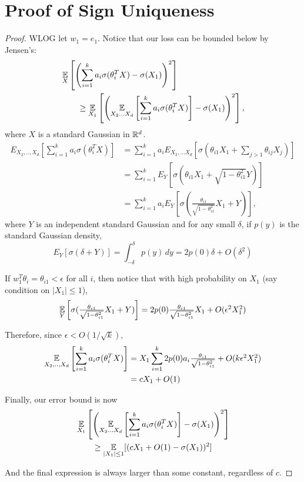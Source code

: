 
\section{Proof of Sign Uniqueness}



\begin{proof}
WLOG let $w_1 = e_1$. Notice that our loss can be bounded below by Jensen's:
%
\begin{align*}
& \operatorname*{\mathbb{E}}_X \left[ \left( \sum_{i=1}^k a_i \sigma(\theta_i^TX) - \sigma(X_1)\right)^2 \right] \\
& \qquad 
\geq \operatorname*{\mathbb{E}}_{X_1} \left[ \left( {\operatorname*{\mathbb{E}}_{X_2...X_d}{\left[ \sum_{i=1}^k a_i \sigma(\theta_i^TX) \right]}}- \sigma(X_1)\right)^2 \right],
\end{align*}
where $X$ is a standard Gaussian in ${\mathbb{R}}^d$. 
%
\begin{align*}
E_{X_2,..,X_d} \left[  \sum_{i=1}^k a_i \sigma(\theta_i^TX) \right] &= \sum_{i=1}^k a_i E_{X_2,...X_d}\left[  \sigma(\theta_{i1}X_1 + \sum_{j >1} \theta_{ij}X_{j})  \right]\\
&= \sum_{i=1}^k E_{Y} \left[   \sigma(\theta_{i1}X_1 + \sqrt{1-\theta_{i1}^2}Y)  \right]  \\
&= \sum_{i=1}^k a_i E_{Y} \left[   \sigma(\textstyle\frac{\theta_{i1}}{\sqrt{1-\theta_{i1}^2}}X_1 + Y)  \right] ,
\end{align*}
where $Y$ is an independent standard Gaussian and for any small $\delta$, if $p(y)$ is the standard Gaussian density, 
%
\[ E_Y[\sigma(\delta + Y)] = \int_{-\delta}^{\delta} p(y) \, dy = 2p(0)\delta + O(\delta^2) \]

If $w_1^T\theta_i = \theta_{i1} < \epsilon$ for all $i$, then notice that with high probability on $X_1$ (say condition on $|X_1| \leq 1$), 
%
\[\operatorname*{\mathbb{E}}_{Y} \left[   \sigma(\textstyle\frac{\theta_{i1}}{\sqrt{1-\theta_{i1}^2}}X_1 + Y)  \right] = 2p(0)\textstyle\frac{\theta_{i1}}{\sqrt{1-\theta_{i1}^2}}X_1 + O(\epsilon^2X_1^2)\]

Therefore, since $\epsilon < O(1/\sqrt{k})$,
%
\begin{align*}
\operatorname*{\mathbb{E}}_{X_2,..,X_d} \left[  \sum_{i=1}^k a_i \sigma(\theta_i^TX)
  \right]  & = X_1
  \sum_{i=1}^k2p(0)a_i\textstyle\frac{\theta_{i1}}{\sqrt{1-\theta_{i1}^2}}
  + O(k\epsilon^2X_1^2) \\
& = cX_1+O(1)
\end{align*}


Finally, our error bound is now
%
\begin{align*}
& \operatorname*{\mathbb{E}}_{X_1} \left[ \left( \operatorname*{\mathbb{E}}_{X_2...X_d}\left[ \sum_{i=1}^k a_i
      \sigma(\theta_i^TX) \right]- \sigma(X_1)\right)^2 \right] \\
& \qquad \geq
\operatorname*{\mathbb{E}}_{|X_1| \leq 1}[(cX_1+O(1) - \sigma(X_1))^2]
\end{align*}

And the final expression is always larger than some constant, regardless of $c$.
\end{proof}
